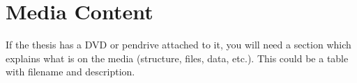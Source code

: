 \chapter{Media Content}

If the thesis has a DVD or pendrive attached to it, you will need a section which explains what is on the media (structure, files, data, etc.).  This could be a table with filename and description.
